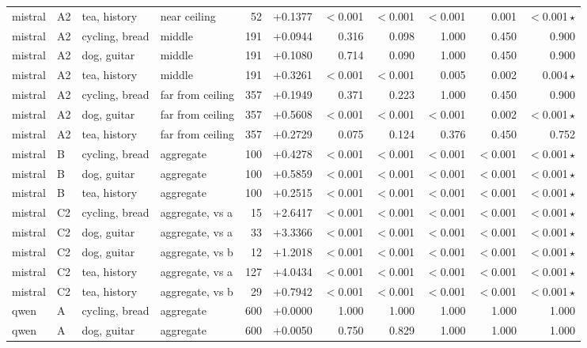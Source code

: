 \begin{center}
\begin{longtable}{llllrrrrrrr}
mistral & A2 & tea, history & near ceiling & 52 & +0.1377 & $<$0.001 & $<$0.001 & $<$0.001 & 0.001 & $<$0.001\,$\star$ \\
mistral & A2 & cycling, bread & middle & 191 & +0.0944 & 0.316 & 0.098 & 1.000 & 0.450 & 0.900 \\
mistral & A2 & dog, guitar & middle & 191 & +0.1080 & 0.714 & 0.090 & 1.000 & 0.450 & 0.900 \\
mistral & A2 & tea, history & middle & 191 & +0.3261 & $<$0.001 & $<$0.001 & 0.005 & 0.002 & 0.004\,$\star$ \\
mistral & A2 & cycling, bread & far from ceiling & 357 & +0.1949 & 0.371 & 0.223 & 1.000 & 0.450 & 0.900 \\
mistral & A2 & dog, guitar & far from ceiling & 357 & +0.5608 & $<$0.001 & $<$0.001 & $<$0.001 & 0.002 & $<$0.001\,$\star$ \\
mistral & A2 & tea, history & far from ceiling & 357 & +0.2729 & 0.075 & 0.124 & 0.376 & 0.450 & 0.752 \\
mistral & B & cycling, bread & aggregate & 100 & +0.4278 & $<$0.001 & $<$0.001 & $<$0.001 & $<$0.001 & $<$0.001\,$\star$ \\
mistral & B & dog, guitar & aggregate & 100 & +0.5859 & $<$0.001 & $<$0.001 & $<$0.001 & $<$0.001 & $<$0.001\,$\star$ \\
mistral & B & tea, history & aggregate & 100 & +0.2515 & $<$0.001 & $<$0.001 & $<$0.001 & $<$0.001 & $<$0.001\,$\star$ \\
mistral & C2 & cycling, bread & aggregate, vs a & 15 & +2.6417 & $<$0.001 & $<$0.001 & $<$0.001 & $<$0.001 & $<$0.001\,$\star$ \\
mistral & C2 & dog, guitar & aggregate, vs a & 33 & +3.3366 & $<$0.001 & $<$0.001 & $<$0.001 & $<$0.001 & $<$0.001\,$\star$ \\
mistral & C2 & dog, guitar & aggregate, vs b & 12 & +1.2018 & $<$0.001 & $<$0.001 & $<$0.001 & $<$0.001 & $<$0.001\,$\star$ \\
mistral & C2 & tea, history & aggregate, vs a & 127 & +4.0434 & $<$0.001 & $<$0.001 & $<$0.001 & $<$0.001 & $<$0.001\,$\star$ \\
mistral & C2 & tea, history & aggregate, vs b & 29 & +0.7942 & $<$0.001 & $<$0.001 & $<$0.001 & $<$0.001 & $<$0.001\,$\star$ \\
qwen & A & cycling, bread & aggregate & 600 & +0.0000 & 1.000 & 1.000 & 1.000 & 1.000 & 1.000 \\
qwen & A & dog, guitar & aggregate & 600 & +0.0050 & 0.750 & 0.829 & 1.000 & 1.000 & 1.000 \\

\end{longtable}
\end{center}
